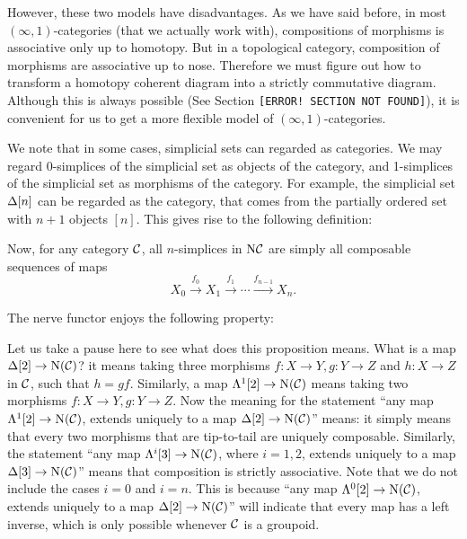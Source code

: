 However, these two models have disadvantages. As we have said before, in most $(\infty,1)$-categories (that we actually work with), compositions
of morphisms is associative only up to homotopy. But in a topological category, composition of morphisms are associative up to nose. 
Therefore we must figure out how to transform a homotopy coherent diagram into a strictly commutative diagram. Although this is always
possible (See Section \texttt{\color{ff0000}[ERROR! SECTION NOT FOUND]}), it is convenient for us to get a more flexible model 
of $(\infty,1)$-categories.

We note that in some cases, simplicial sets can regarded as categories. We may regard 0-simplices of the simplicial set as objects of the category,
and 1-simplices of the simplicial set as morphisms of the category. For example, the simplicial set $\Delta[n]$ can be regarded as the category, 
that comes from the partially ordered set with $n+1$ objects $[n]$. This gives rise to the following definition:


Now, for any category $\mathcal{C}$, all $n$-simplices in $\mathrm{N}\mathcal{C}$ are simply all composable sequences of maps 
$$X_0\xrightarrow{f_0}X_1\xrightarrow{f_1}\cdots\xrightarrow{f_{n-1}}X_n.$$

The nerve functor enjoys the following property:


Let us take a pause here to see what does this proposition means. What is a map $\Delta[2]\to \mathrm{N}(\mathcal{C})$? it means taking three morphisms
$f:X\to Y,g:Y\to Z$ and $h:X\to Z$ in $\mathcal{C}$, such that $h=gf$. Similarly, a map $\Lambda^1[2]\to \mathrm{N}(\mathcal{C})$ means taking two morphisms 
$f:X\to Y,g:Y\to Z$. Now the meaning for the statement ``any map $\Lambda^1[2]\to \mathrm{N}(\mathcal{C})$, extends uniquely to a map $\Delta[2]\to \mathrm{N}(\mathcal{C})$'' means: 
it simply means that every two morphisms that are tip-to-tail are uniquely composable. Similarly, the statement ``any map $\Lambda^i[3]\to \mathrm{N}(\mathcal{C})$,
where $i=1,2$, extends uniquely to a map $\Delta[3]\to \mathrm{N}(\mathcal{C})$'' means that composition is strictly associative. Note that we do not
include the cases $i=0$ and $i=n$. This is because ``any map $\Lambda^0[2]\to \mathrm{N}(\mathcal{C})$, extends uniquely to a map $\Delta[2]\to \mathrm{N}(\mathcal{C})$''
will indicate that every map has a left inverse, which is only possible whenever $\mathcal{C}$ is a groupoid.

